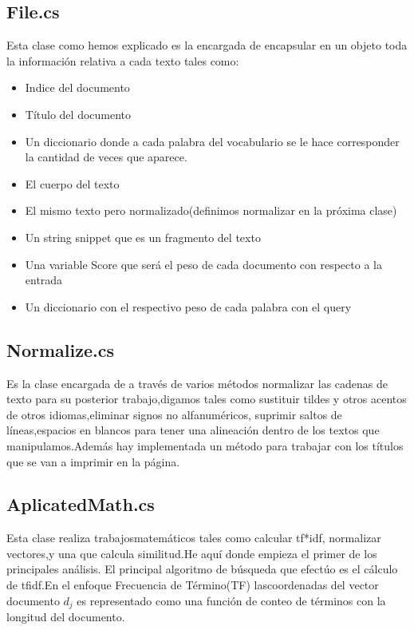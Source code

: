 \documentclass[a4paper,12pt]{article}
\begin{document}
\subsection{File.cs}
Esta clase como hemos explicado es la encargada de encapsular en un objeto
toda la información relativa a cada texto tales como:
\begin{itemize}
    \item Indice del documento
    \item T\'itulo del documento
    \item Un diccionario donde a cada palabra del vocabulario se le hace corresponder la
    cantidad de veces que aparece.
    \item El cuerpo del texto
    \item El  mismo texto pero normalizado(definimos normalizar en la próxima clase)
    \item Un string snippet  que es un fragmento del texto
    \item Una variable Score que será el peso de cada documento con respecto a la
    entrada
    \item Un diccionario con el respectivo peso de cada  palabra con el query
    
\end{itemize}

\subsection{ Normalize.cs}

Es la clase encargada de a través de varios métodos normalizar las cadenas de
texto para su posterior trabajo,digamos tales como sustituir tildes y otros
acentos de otros idiomas,eliminar signos no alfanuméricos,
suprimir saltos de líneas,espacios en  blancos para tener una
alineación dentro de los textos que manipulamos.Adem\'as hay implementada
un método para trabajar con los títulos que se van a imprimir en la p\'agina.



\subsection{AplicatedMath.cs}
Esta clase realiza  trabajosmatemáticos tales como calcular tf*idf, normalizar
vectores,y una que calcula similitud.He aquí donde empieza el primer de los
principales análisis.
El principal algoritmo de búsqueda que efectúo es el c\'alculo de tfidf.En el
enfoque Frecuencia de T\'ermino(TF)  lascoordenadas del vector documento $d_j$
es representado como una  función de conteo de términos con la longitud del
documento.
\end{document}
